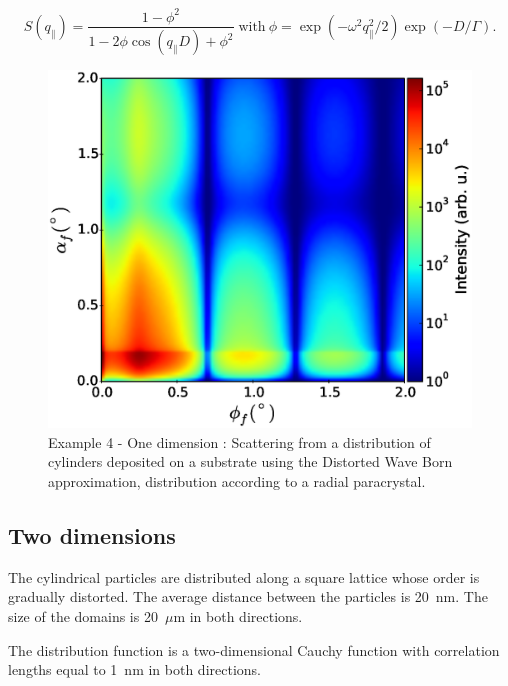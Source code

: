 \begin{equation*}
S(q_{\parallel})= \frac{1-\phi^2 }{1-2\phi\cos(q_{\parallel} D)+\phi^2} \; \textrm{with} \ \phi=\exp(-\omega^2 q_{\parallel}^2/2)\exp(-D/\Gamma).
\end{equation*}


\begin{figure}[H]
\includegraphics[width=.49\textwidth]{Figures/py-ex/figure_ex0041DDL.eps}
\caption{Example 4 - One dimension : Scattering from a distribution of cylinders deposited on a substrate using the Distorted Wave Born approximation, distribution according to a radial paracrystal.}
\label{fig:PythonEx41DDL}
\end{figure}


\subsection{Two dimensions}
The cylindrical particles are distributed along a square lattice whose order is gradually distorted.
The average distance between the particles is 20~nm. The size of the domains is 20~$\mu$m in both directions.

The distribution function is a two-dimensional Cauchy function with correlation lengths equal to 1~nm in both directions.



